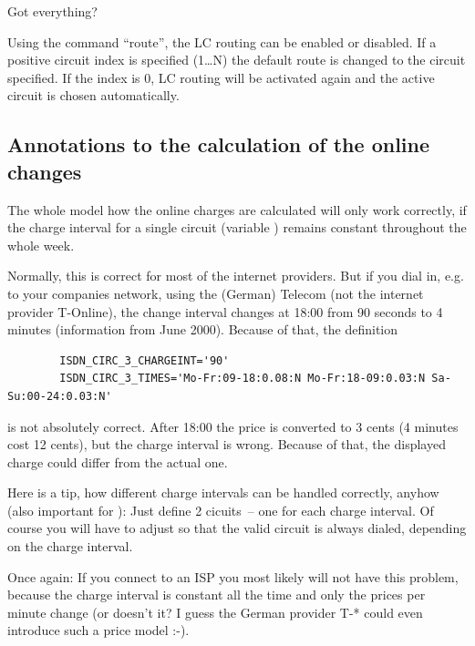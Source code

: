   Got everything?

  Using the command ``route'', the LC routing can be enabled or disabled.
  If a positive circuit index is specified (1\ldots N) the default route
  is changed to the circuit specified. If the index is 0, LC routing will be
  activated again and the active circuit is chosen automatically.


  \subsection{Annotations to the calculation of the online changes}

  The whole model how the online charges are calculated will only work
  correctly, if the charge interval for a single circuit (variable
  ) remains constant throughout the whole
  week.

  Normally, this is correct for most of the internet providers. But if you
  dial in, e.g. to your companies network, using the (German) Telecom (not
  the internet provider T-Online), the change interval changes at 18:00 from
  90 seconds to 4 minutes (information from June 2000). Because of that, the
  definition

\begin{example}
\begin{verbatim}
        ISDN_CIRC_3_CHARGEINT='90'
        ISDN_CIRC_3_TIMES='Mo-Fr:09-18:0.08:N Mo-Fr:18-09:0.03:N Sa-Su:00-24:0.03:N'
\end{verbatim}
\end{example}

  is not absolutely correct. After 18:00 the price is converted to 3
  cents (4 minutes cost 12 cents), but the charge interval is wrong.
  Because of that, the displayed charge could differ from the actual one.

  Here is a tip, how different charge intervals can be handled correctly,
  anyhow (also important for ):
  Just define 2 cicuits~-- one for each charge interval.
  Of course you will have to adjust 
  so that the valid circuit is always dialed, depending on the charge
  interval.

  Once again: If you connect to an ISP you most likely will not have this
  problem, because the charge interval is constant all the time and
  only the prices per minute change (or doesn't it? I guess the German
  provider T-* could even introduce such a price model :-).

